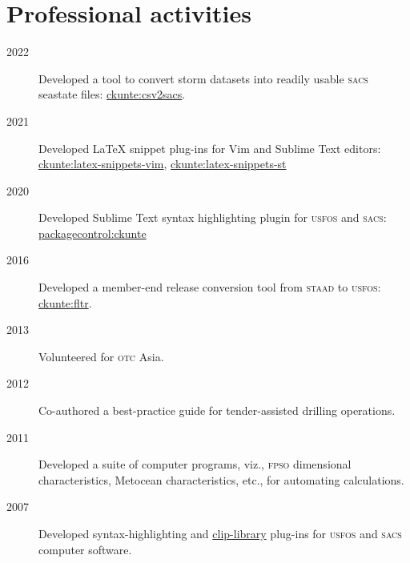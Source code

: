 \section*{Professional activities} %
\label{sec:prof_activities}

\begin{description}
\item[2022]Developed a tool to convert storm datasets into readily usable \textsc{sacs} seastate files: \href{https://github.com/ckunte/csv2sacs}{ckunte:csv2sacs}.

\item[2021]Developed {\LaTeX} snippet plug-ins for Vim and Sublime Text editors: \href{https://github.com/ckunte/latex-snippets-vim}{ckunte:latex-snippets-vim}, \href{https://github.com/ckunte/latex-snippets-st}{ckunte:latex-snippets-st}

\item[2020]Developed Sublime Text syntax highlighting plugin for \textsc{usfos} and \textsc{sacs}: \href{https://packagecontrol.io/browse/authors/ckunte}{packagecontrol:ckunte}

\item[2016]Developed a member-end release conversion tool from \textsc{staad} to \textsc{usfos}: \href{https://gist.github.com/ckunte/98fc79713b8d111b0aa6fec792b194b3}{ckunte:fltr}.

\item[2013]Volunteered for \textsc{otc} Asia.

\item[2012]Co-authored a best-practice guide for tender-assisted drilling operations.

\item[2011]Developed a suite of computer programs, viz., \textsc{fpso} dimensional characteristics, Metocean characteristics, etc., for automating calculations.


\item[2007]Developed syntax-highlighting and \href{https://www.textpad.com/addons/cliplibs}{clip-library} plug-ins for \textsc{usfos} and \textsc{sacs} computer software.

\end{description}

